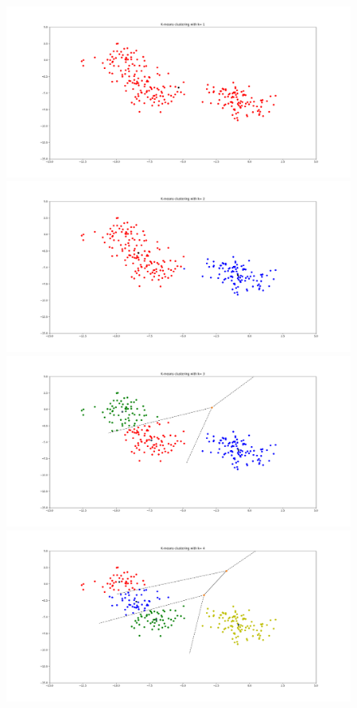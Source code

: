 \documentclass[letterpaper, 12pt]{article}
\begin{document}
\begin{figure}[h]
    \includegraphics[scale=0.15]{11k1}
    \includegraphics[scale=0.15]{11k2}
    \includegraphics[scale=0.15]{11k3}
    \includegraphics[scale=0.15]{11k4}

\end{figure}
\end{document}
